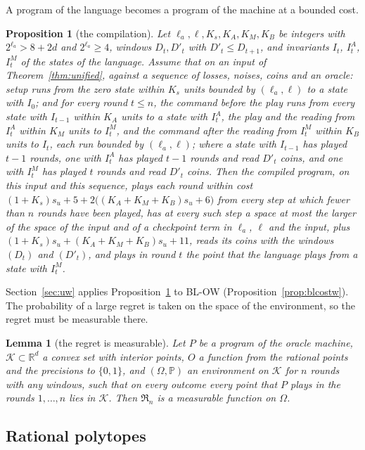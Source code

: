 \documentclass[11pt]{amsart}
\newtheorem{lemma}[theorem]{Lemma}
\newtheorem{proposition}[theorem]{Proposition}
\theoremstyle{definition}
\numberwithin{equation}{section}
\newcommand{\R}{\mathbb{R}}
\newcommand{\Prob}{\mathbb{P}}
\newcommand{\cK}{\mathcal{K}}
\newcommand{\Reg}{\mathfrak{R}}
\begin{document}
A program of the language becomes a program of the machine at a bounded cost.

\begin{proposition}[the compilation]\label{prop:compile}
Let $\ell_a,\ell,K_s,K_A,K_M,K_B$ be integers with $2^{\ell_a}>8+2d$ and $2^{\ell_a}\ge4$, windows $D_t,D'_t$ with $D'_t\le D_{t+1}$, and invariants $I_t$, $I^A_t$, $I^M_t$ of the states of the language. Assume that on an input of Theorem~\ref{thm:unified}, against a sequence of losses, noises, coins and an oracle: setup runs from the zero state within $K_s$ units bounded by $(\ell_a,\ell)$ to a state with $I_0$; and for every round $t\le n$, the command before the play runs from every state with $I_{t-1}$ within $K_A$ units to a state with $I^A_t$, the play and the reading from $I^A_t$ within $K_M$ units to $I^M_t$, and the command after the reading from $I^M_t$ within $K_B$ units to $I_t$, each run bounded by $(\ell_a,\ell)$; where a state with $I_{t-1}$ has played $t-1$ rounds, one with $I^A_t$ has played $t-1$ rounds and read $D'_t$ coins, and one with $I^M_t$ has played $t$ rounds and read $D'_t$ coins. Then the compiled program, on this input and this sequence, plays each round within cost $(1+K_s)s_u+5+2\bigl((K_A+K_M+K_B)s_u+6\bigr)$ from every step at which fewer than $n$ rounds have been played, has at every such step a space at most the larger of the space of the input and of a checkpoint term in $\ell_a$, $\ell$ and the input, plus $(1+K_s)s_u+(K_A+K_M+K_B)s_u+11$, reads its coins with the windows $(D_t)$ and $(D'_t)$, and plays in round $t$ the point that the language plays from a state with $I^M_t$.
\end{proposition}

Section~\ref{sec:uw} applies Proposition~\ref{prop:compile} to BL-OW (Proposition~\ref{prop:blcostw}). The probability of a large regret is taken on the space of the environment, so the regret must be measurable there.

\begin{lemma}[the regret is measurable]\label{lem:regmeas}
Let $P$ be a program of the oracle machine, $\cK\subset\R^d$ a convex set with interior points, $O$ a function from the rational points and the precisions to $\{0,1\}$, and $(\Omega,\Prob)$ an environment on $\cK$ for $n$ rounds with any windows, such that on every outcome every point that $P$ plays in the rounds $1,\dots,n$ lies in $\cK$. Then $\Reg_n$ is a measurable function on $\Omega$.
\end{lemma}

\subsection{Rational polytopes}\label{sec:bit-poly}
\end{document}
